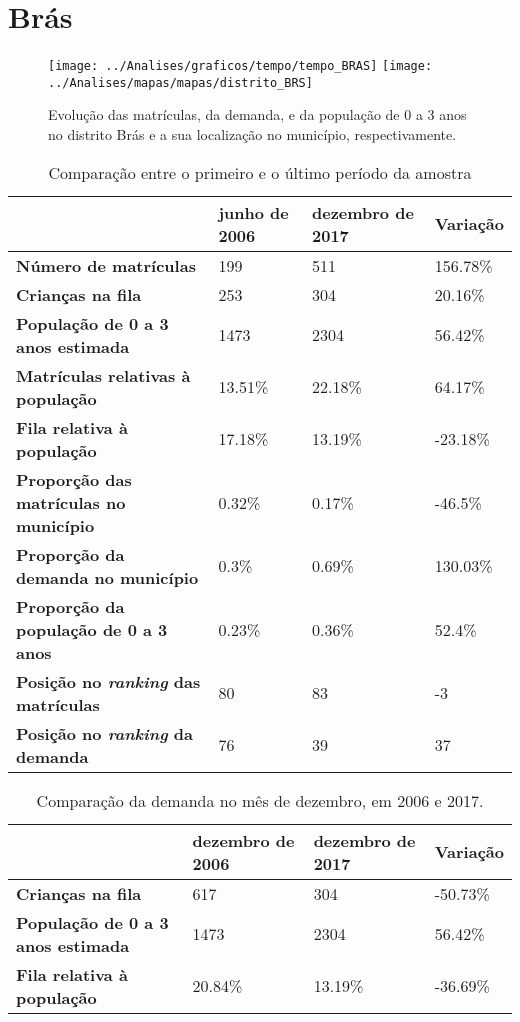 \section{Brás}
\begin{figure}[H]
\centering
\texttt{[image: ../Analises/graficos/tempo/tempo\_BRAS]}
\texttt{[image: ../Analises/mapas/mapas/distrito\_BRS]}
\caption{Evolução das matrículas, da demanda, e da população de 0 a 3 anos no distrito Brás e a sua localização no município, respectivamente.}
\end{figure}
\begin{table}[H]
\begin{tabular}{l|l|l|l}
\textbf{}                                      & \textbf{junho de 2006}       & \textbf{dezembro de 2017}    & \textbf{Variação} \\ \hline
\textbf{Número de matrículas}                  & 199 & 511 & 156.78\% \\ \hline
\textbf{Crianças na fila}                      & 253 & 304 & 20.16\% \\ \hline
\textbf{População de 0 a 3 anos estimada}      & 1473 & 2304 & 56.42\% \\ \hline
\textbf{Matrículas relativas à população}      & 13.51\% & 22.18\% & 64.17\% \\ \hline
\textbf{Fila relativa à população}             & 17.18\% & 13.19\% & -23.18\% \\ \hline
\textbf{Proporção das matrículas no município} & 0.32\% & 0.17\% & -46.5\% \\ \hline
\textbf{Proporção da demanda no município}     & 0.3\% & 0.69\% & 130.03\% \\ \hline
\textbf{Proporção da população de 0 a 3 anos}  & 0.23\% & 0.36\% & 52.4\% \\ \hline
\textbf{Posição no \textit{ranking} das matrículas}     & 80 & 83 & -3 \\ \hline
\textbf{Posição no \textit{ranking} da demanda}         & 76 & 39 & 37 \\ 
\end{tabular}
\caption{Comparação entre o primeiro e o último período da amostra}
\end{table}
\begin{table}[H]
\begin{tabular}{l|l|l|l}
\textbf{}                                 & \textbf{dezembro de 2006} & \textbf{dezembro de 2017} & \textbf{Variação} \\ \hline
\textbf{Crianças na fila}                      & 617 & 304 & -50.73\% \\ \hline
\textbf{População de 0 a 3 anos estimada}      & 1473 & 2304 & 56.42\% \\ \hline
\textbf{Fila relativa à população}             & 20.84\% & 13.19\% & -36.69\% \\
\end{tabular}
\caption{Comparação da demanda no mês de dezembro, em 2006 e 2017.}
\end{table}
